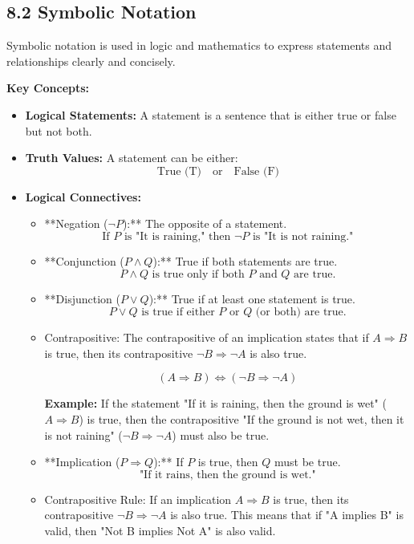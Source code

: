 
\subsection*{8.2 Symbolic Notation}

Symbolic notation is used in logic and mathematics to express statements and relationships clearly and concisely.

\textbf{Key Concepts:}
\begin{itemize}
	\item \textbf{Logical Statements:} A statement is a sentence that is either true or false but not both.
	
	\item \textbf{Truth Values:} A statement can be either:
	\[
	\text{True (T)} \quad \text{or} \quad \text{False (F)}
	\]
	
	\item \textbf{Logical Connectives:}
	\begin{itemize}
		\item **Negation ($\neg P$):** The opposite of a statement.
		\[
		\text{If } P \text{ is "It is raining," then } \neg P \text{ is "It is not raining."}
		\]
		\item **Conjunction ($P \land Q$):** True if both statements are true.
		\[
		P \land Q \text{ is true only if both } P \text{ and } Q \text{ are true.}
		\]
		\item **Disjunction ($P \lor Q$):** True if at least one statement is true.
		\[
		P \lor Q \text{ is true if either } P \text{ or } Q \text{ (or both) are true.}
		\]
		\item Contrapositive: The contrapositive of an implication states that if $A \Rightarrow B$ is true, then its contrapositive $\neg B \Rightarrow \neg A$ is also true.
		
		\[
		(A \Rightarrow B) \Leftrightarrow (\neg B \Rightarrow \neg A)
		\]
		
		\textbf{Example:}  
		If the statement "If it is raining, then the ground is wet" ($A \Rightarrow B$) is true, then the contrapositive "If the ground is not wet, then it is not raining" ($\neg B \Rightarrow \neg A$) must also be true.
		
		\item **Implication ($P \Rightarrow Q$):** If $P$ is true, then $Q$ must be true.
		\[
		\text{"If it rains, then the ground is wet."}
		\]
		\item Contrapositive Rule: If an implication $A \Rightarrow B$ is true, then its contrapositive $\neg B \Rightarrow \neg A$ is also true. This means that if "A implies B" is valid, then "Not B implies Not A" is also valid.
		

\end{itemize}
\end{itemize}
